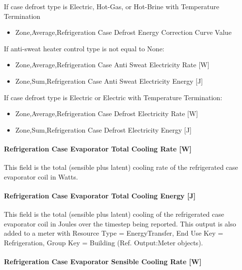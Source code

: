 If case defrost type is Electric, Hot-Gas, or Hot-Brine with Temperature Termination

\begin{itemize}
\tightlist
\item
  Zone,Average,Refrigeration Case Defrost Energy Correction Curve Value
\end{itemize}

If anti-sweat heater control type is not equal to None:

\begin{itemize}
\item
  Zone,Average,Refrigeration Case Anti Sweat Electricity Rate {[}W{]}
\item
  Zone,Sum,Refrigeration Case Anti Sweat Electricity Energy {[}J{]}
\end{itemize}

If case defrost type is Electric or Electric with Temperature Termination:

\begin{itemize}
\item
  Zone,Average,Refrigeration Case Defrost Electricity Rate {[}W{]}
\item
  Zone,Sum,Refrigeration Case Defrost Electricity Energy {[}J{]}
\end{itemize}

\paragraph{Refrigeration Case Evaporator Total Cooling Rate {[}W{]}}\label{refrigeration-case-evaporator-total-cooling-rate-w}

This field is the total (sensible plus latent) cooling rate of the refrigerated case evaporator coil in Watts.

\paragraph{Refrigeration Case Evaporator Total Cooling Energy {[}J{]}}\label{refrigeration-case-evaporator-total-cooling-energy-j}

This field is the total (sensible plus latent) cooling of the refrigerated case evaporator coil in Joules over the timestep being reported. This output is also added to a meter with Resource Type = EnergyTransfer, End Use Key = Refrigeration, Group Key = Building (Ref. Output:Meter objects).

\paragraph{Refrigeration Case Evaporator Sensible Cooling Rate {[}W{]}}\label{refrigeration-case-evaporator-sensible-cooling-rate-w}

